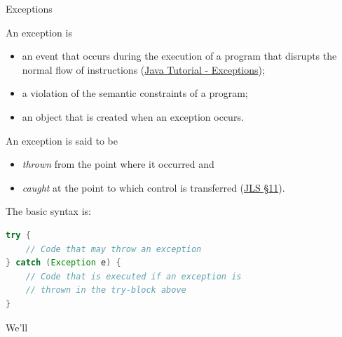 \documentclass{beamer}
\author[Chris Simpkins] 
{Christopher Simpkins \\\texttt{chris.simpkins@gatech.edu}}
\institute[Georgia Tech] %
\date[CS 1331]{}
\begin{document}
\begin{frame}
  \titlepage
\end{frame}

\begin{frame}[fragile]{Exceptions}


An exception is
\begin{itemize}
\item an event that occurs during the execution of a program that disrupts the normal flow of instructions (\href{http://docs.oracle.com/javase/tutorial/essential/exceptions/index.html}{Java Tutorial - Exceptions});
\item a violation of the semantic constraints of a program;
\item an object that is created when an exception occurs.
\end{itemize}
\vspace{.1in}
An exception is said to be 
\begin{itemize}
\item {\it thrown} from the point where it occurred and
\item {\it caught} at the point to which control is transferred (\href{http://docs.oracle.com/javase/specs/jls/se7/html/jls-11.html}{JLS \S 11}).
\end{itemize} 
The basic syntax is:
\begin{lstlisting}[language=Java]
try {
    // Code that may throw an exception
} catch (Exception e) {
    // Code that is executed if an exception is
    // thrown in the try-block above
}
\end{lstlisting}
We'll

\end{frame}
\end{document}

